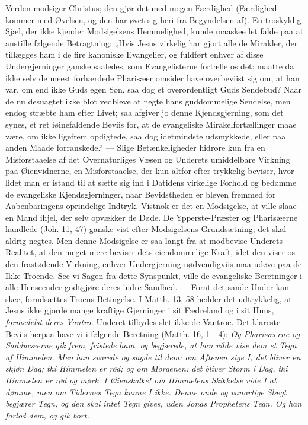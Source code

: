 \documentclass[12pt,a4paper]{book}
\begin{document}
Verden modsiger Christus; den gjør det med megen Færdighed (Færdighed kommer med
Øvelsen, og den har øvet sig heri fra Begyndelsen af). En troskyldig Sjæl, der ikke
kjender Modsigelsens Hemmelighed, kunde maaskee let falde paa at anstille følgende
Betragtning: „Hvis Jesus virkelig har gjort alle de Mirakler, der tillægges ham i de
fire kanoniske Evangelier, og fuldført enhver af disse Undergjerninger ganske saaledes,
som Evangelisterne fortælle os det: maatte da ikke selv de meest forhærdede Pharisæer
omsider have overbeviist sig om, at han var, om end ikke Guds egen Søn, saa dog et
overordentligt Guds Sendebud? Naar de nu desuagtet ikke blot vedbleve at negte hans
guddommelige Sendelse, men endog stræbte ham efter Livet; saa afgiver jo denne
Kjendsgjerning, som det synes, et ret iøinefaldende Beviis for, at de evangeliske
Mirakelfortællinger maae være, om ikke ligefrem opdigtede, saa dog idetmindste
udsmykkede, eller paa anden Maade forranskede.“ --- Slige Betænkeligheder hidrøre kun
fra en Misforstaaelse af det Overnaturliges Væsen og Underets umiddelbare Virkning paa
Øienvidnerne, en Misforstaaelse, der kun altfor efter\-%
trykkelig beviser, hvor lidet man er istand til at sætte sig ind i Datidens virkelige
Forhold og bedømme de evangeliske Kjendsgjerninger, naar Bevidstheden er bleven fremmed
for Aabenbaringens oprindelige Indtryk. Vistnok er det en Modsigelse, at ville slaae en
Mand ihjel, der selv opvækker de Døde. De Ypperste-Præster og Pharisæerne handlede
(Joh. 11, 47) ganske vist efter Modsigelsens Grundsætning; det skal aldrig negtes. Men
denne Modsigelse er saa langt fra at modbevise Underets Realitet, at den meget mere
beviser dets eiendommelige Kraft, idet den viser os den frastødende Virkning, enhver
Undergjerning nødvendigviis maa udøve paa de Ikke-Troende. See vi Sagen fra dette
Synspunkt, ville de evangeliske Beretninger i alle Henseender godtgjøre deres indre
Sandhed. --- Forat det sande Under kan skee, forudsættes Troens Betingelse. I Matth.
13, 58 hedder det udtrykkelig, at Jesus ikke gjorde mange kraftige Gjerninger i sit
Fædreland og i sit Huus, \emph{formedelst deres Vantro.} Underet tilbydes slet ikke de
Vantroe. Det klareste Beviis herpaa have vi i følgende Beretning (Matth. 16, 1---4):
\emph{Og Pharisæerne og Sadducæerne gik frem, fristede ham, og begjærede, at han vilde
vise dem et Tegn af Himmelen. Men han svarede og sagde til dem: om Aftenen sige I, det
bliver en skjøn Dag; thi Himmelen er rød; og om Morgenen: det bliver Storm i Dag, thi
Himmelen er rød og mørk. I Øienskalke! om Himmelens Skikkelse vide I at dømme, men om
Tidernes Tegn kunne I ikke. Denne onde og vanartige Slægt begjærer Tegn, og den skal
intet Tegn gives, uden Jonas Prophetens Tegn. Og han forlod dem, og gik bort.}
\end{document}
